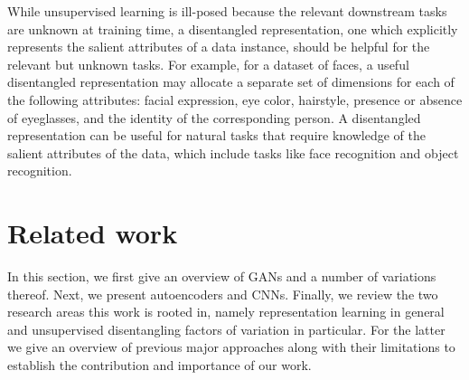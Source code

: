 \documentclass[11pt,a4paper]{article}
\begin{document}
While unsupervised learning is ill-posed because the relevant downstream tasks are unknown at training time, a disentangled representation, one which explicitly represents the salient attributes of a data instance, should be helpful for the relevant but unknown tasks. For example, for a dataset of faces, a useful disentangled representation may allocate a separate set of dimensions for each of the following attributes: facial expression, eye color, hairstyle, presence or absence of eyeglasses, and the identity of the corresponding person. A disentangled representation can be useful for natural tasks that require knowledge of the salient attributes of the data, which include tasks like face recognition and object recognition.

\section{Related work}
In this section, we first give an overview of GANs and a number of variations thereof. Next, we present autoencoders and CNNs. Finally, we review the two research areas this work is rooted in, namely representation learning in general and unsupervised disentangling factors of variation in particular. For the latter we give an overview of previous major approaches along with their limitations to establish the contribution and importance of our work.
\end{document}
